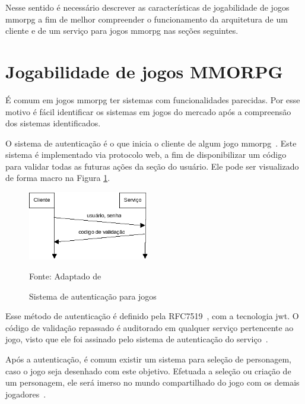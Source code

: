 Nesse sentido é necessário descrever as características de jogabilidade de jogos \ac{mmorpg} a fim de melhor compreender o funcionamento da arquitetura de um cliente e de um serviço para jogos \ac{mmorpg} nas seções seguintes.



\section{Jogabilidade de jogos MMORPG}
\label{sec:jogabilidade}



É comum em jogos \ac{mmorpg} ter sistemas com funcionalidades parecidas.
%
Por esse motivo é fácil identificar os sistemas em jogos do mercado após a compreensão dos sistemas identificados.



O sistema de autenticação é o que inicia o cliente de algum jogo \ac{mmorpg}~\cite{albion_online_unite, matthiasrudy2011}.
%
Este sistema é implementado via protocolo web, a fim de disponibilizar um código para validar todas as futuras ações da seção do usuário.
%
Ele pode ser visualizado de forma macro na Figura \ref{fig:autenticacao}.


\begin{figure}[htb!]
\caption{Sistema de autenticação para jogos}
\label{fig:autenticacao}
\includegraphics[height=3cm]{img/cap2/autenticacao.png}
\centering

Fonte: Adaptado de ~\cite{LeckyThompson2008Nov}
\end{figure}



Esse método de autenticação é definido pela RFC7519~\cite{rfc7519}, com a tecnologia \ac{jwt}.
%
O código de validação repassado é auditorado em qualquer serviço pertencente ao jogo, visto que ele foi assinado pelo sistema de autenticação do serviço~\cite{Ikem2018May}.


Após a autenticação, é comum existir um sistema para seleção de personagem, caso o jogo seja desenhado com este objetivo.
%
Efetuada a seleção ou criação de um personagem, ele será imerso no mundo compartilhado do jogo com os demais jogadores~\cite{matthiasrudy2011}.


